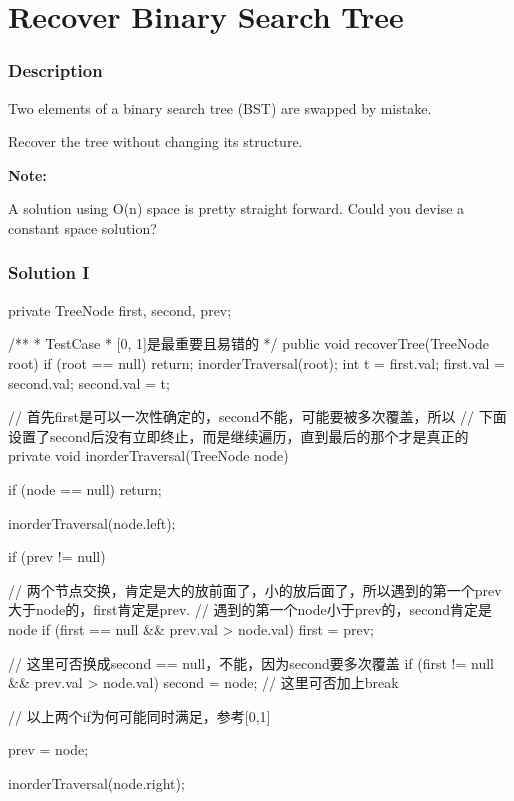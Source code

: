 \newpage

\section{Recover Binary Search Tree} %

\subsubsection{Description}
Two elements of a binary search tree (BST) are swapped by mistake.

Recover the tree without changing its structure.

\textbf{Note:}

A solution using O(n) space is pretty straight forward. Could you devise a constant space solution?

\subsubsection{Solution I}

\begin{Code}
private TreeNode first, second, prev;

/**
 * TestCase
 * [0, 1]是最重要且易错的
 */
public void recoverTree(TreeNode root) {
    if (root == null) {
        return;
    }
    inorderTraversal(root);
    int t = first.val;
    first.val = second.val;
    second.val = t;
}

// 首先first是可以一次性确定的，second不能，可能要被多次覆盖，所以
// 下面设置了second后没有立即终止，而是继续遍历，直到最后的那个才是真正的
private void inorderTraversal(TreeNode node) {
    if (node == null) {
        return;
    }

    inorderTraversal(node.left);

    if (prev != null) {
        // 两个节点交换，肯定是大的放前面了，小的放后面了，所以遇到的第一个prev大于node的，first肯定是prev.
        // 遇到的第一个node小于prev的，second肯定是node
        if (first == null && prev.val > node.val) {
            first = prev;
        }

        // 这里可否换成second == null，不能，因为second要多次覆盖
        if (first != null && prev.val > node.val) {
            second = node;
            // 这里可否加上break
        }

        // 以上两个if为何可能同时满足，参考[0,1]
    }

    prev = node;

    inorderTraversal(node.right);
}
\end{Code}

